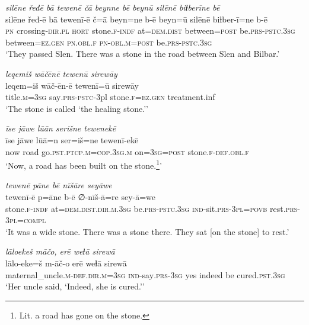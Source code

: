 \ea \label{ŽP.167}
\textit{silēne řeđē bā tewenē čā beynne bē beynū silēnē biɫberīne bē} \\ 
\gll silēne řeđ-ē bā tewenī-ē č=ā beyn=ne b-ē beyn=ū silēnē biɫber-ī=ne b-ē \\ 
 \textsc{pn} crossing\textsc{-dir}\textsc{.pl} \textsc{hort} stone\textsc{.f}\textsc{-indf} at=\textsc{dem.dist} between\textsc{=\textsc{post}} be\textsc{.prs}\textsc{-pstc}\textsc{.3sg} between\textsc{\textsc{=ez.gen}} \textsc{pn}\textsc{.obl}\textsc{.f} \textsc{pn}\textsc{-obl}\textsc{.m}\textsc{=\textsc{post}} be\textsc{.prs}\textsc{-pstc}\textsc{.3sg} \\ 
\glt `They passed Slen. There was a stone in the road between Slen and Bilbar.'
\z 
 
\ea \label{ŽP.168}
\textit{leqemiš wāčēnē tewenū sirewāy} \\ 
\gll leqem=iš wāč-ēn-ē tewenī=ū sirewāy \\ 
 title\textsc{.m}\textsc{=3sg} say\textsc{.prs-pstc}-3pl stone\textsc{.f}\textsc{\textsc{=ez.gen}} treatment.inf \\ 
\glt `The stone is called ‘the healing stone.’'
\z 
 
\ea \label{ŽP.170}
\textit{īse jāwe lūān serišne tewenekē} \\ 
\gll īse jāwe lūā=n ser=iš=ne tewenī-ekē \\ 
 now road go\textsc{.pst}\textsc{.ptcp}\textsc{.m}\textsc{=cop}\textsc{.3sg}\textsc{.m} on\textsc{=3sg}\textsc{=\textsc{post}} stone\textsc{.f}\textsc{-def}\textsc{.obl}\textsc{.f} \\ 
\glt `Now, a road has been built on the stone.\footnote{Lit. a road has gone on the stone.}'
\z 
 
\ea \label{ŽP.171}
\textit{tewenē pāne bē nīšāre seyāwe} \\ 
\gll tewenī-ē p=āne b-ē ∅-nīš-ā=re sey-ā=we \\ 
 stone\textsc{.f}\textsc{-indf} at=\textsc{dem.dist}\textsc{.dir}\textsc{.m}\textsc{.3sg} be\textsc{.prs}\textsc{-pstc}\textsc{.3sg} \textsc{ind-}sit\textsc{.prs}\textsc{-3pl}\textsc{=\textsc{povb}} rest\textsc{.prs}\textsc{-3pl}\textsc{=compl} \\ 
\glt `It was a wide stone. There was a stone there. They sat [on the stone] to rest.'
\z 
 
\ea \label{ŽP.174}
\textit{lāloekeš māčo, erē weɫā sirewā} \\ 
\gll lālo-eke=š m-āč-o erē weɫā sirewā \\ 
 maternal\_uncle\textsc{.m}\textsc{-def}\textsc{.dir}\textsc{.m}\textsc{=3sg} \textsc{ind-}say\textsc{.prs}\textsc{-3sg} yes indeed be cured\textsc{.pst}\textsc{.3sg} \\ 
\glt `Her uncle said, ‘Indeed, she is cured.’'
\z 
 
